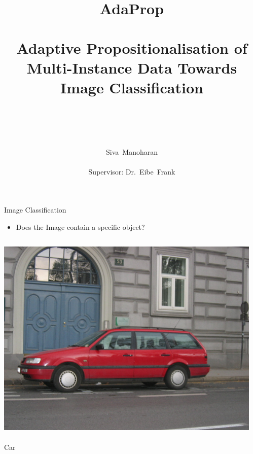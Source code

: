 \documentclass{beamer}
\title{ ~ \\ ~ \\ {\huge{AdaProp}} \\ ~ \\ 
    {\large Adaptive Propositionalisation of Multi-Instance Data Towards Image Classification} \\ ~ }
\subtitle{}
\author{~ \\ ~\\ Siva~Manoharan \\~\\ Supervisor: Dr.~Eibe~Frank}
\date{}
\begin{document}
{
\makeatletter %
    \def\beamer@entrycode{\vspace*{-\headheight}} %
\makeatother

\begin{frame}
  \titlepage
\end{frame}
}

\begin{frame}{Image Classification}
\vspace{-0.5cm}
    \begin{itemize}
        \item Does the Image contain a specific object?
    \end{itemize}
\vspace{-0.5cm}
  \begin{columns}[T]
    \begin{column}{.5\textwidth}
    \begin{center} \includegraphics[scale=0.25]{img/cars1} \\~\\ {\Large Car} \end{center}
    \end{column}
    \begin{column}{.5\textwidth}

\end{column}
\end{columns}
\end{frame}
\end{document}
